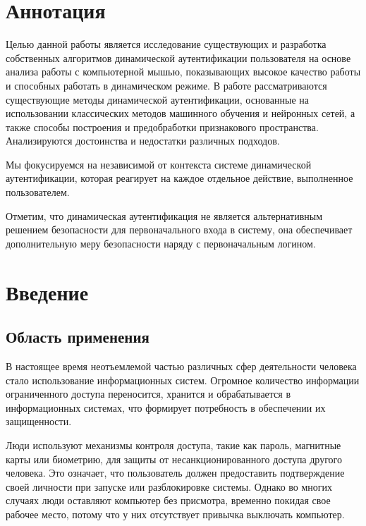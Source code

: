 \documentclass[12pt]{article}
\begin{document}
    \section{Аннотация}
    \label{sec:Annotation}

    \par Целью данной работы является исследование существующих и разработка собственных алгоритмов динамической аутентификации пользователя на основе анализа работы с компьютерной мышью, показывающих высокое качество работы и способных работать в динамическом режиме. В работе рассматриваются существующие методы динамической аутентификации, основанные на использовании классических методов машинного обучения и нейронных сетей, а также способы построения и предобработки признакового пространства. Анализируются достоинства и недостатки различных подходов.

    \par Мы фокусируемся на независимой от контекста системе динамической аутентификации, которая реагирует на каждое отдельное действие, выполненное пользователем.

    \par Отметим, что динамическая аутентификация не является альтернативным решением безопасности для первоначального входа в систему, она обеспечивает дополнительную меру безопасности наряду с первоначальным логином.

    \newpage



    \section{Введение}
    \label{sec:Intro}

    \subsection{Область применения}
    \label{sec:Intro:ApplicationArea}

    \par В настоящее время неотъемлемой частью различных сфер деятельности человека стало использование информационных систем. Огромное количество информации ограниченного доступа переносится, хранится и обрабатывается в информационных системах, что формирует потребность в обеспечении их защищенности.

    \par Люди используют механизмы контроля доступа, такие как пароль, магнитные карты или биометрию, для защиты от несанкционированного доступа другого человека. Это означает, что пользователь должен предоставить подтверждение своей личности при запуске или разблокировке системы. Однако во многих случаях люди оставляют компьютер без присмотра, временно покидая свое рабочее место, потому что у них отсутствует привычка выключать компьютер.
\end{document}
